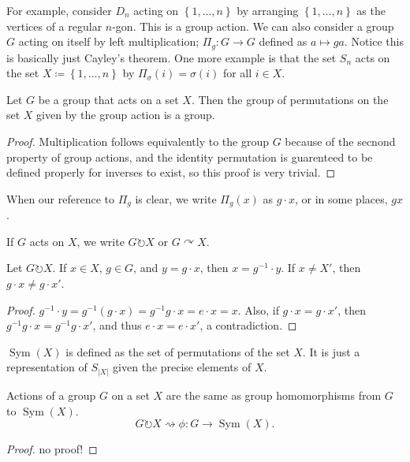 For example, consider $D_n$ acting on $\left\{ 1,\ldots, n \right\} $ by arranging $\left\{ 1, \ldots,n \right\} $ as the vertices of a regular $n$-gon. This is a group action. We can also consider a group $G$ acting on itself by left multiplication; $\Pi_g : G \to G$ defined as $a\mapsto ga$. Notice this is basically just Cayley's theorem. One more example is that the set $S_n$ acts on the set $X\coloneqq \left\{ 1,\ldots,n \right\} $ by $\Pi_\sigma (i)=\sigma(i)$ for all $i\in X$.
\begin{proposition}
	Let $G$ be a group that acts on a set $X$. Then the group of permutations on the set $X$ given by the group action is a group.
\end{proposition}
\begin{proof}
	Multiplication follows equivalently to the group $G$ because of the secnond property of group actions, and the identity permutation is guarenteed to be defined properly for inverses to exist, so this proof is very trivial.
\end{proof}
\begin{notation}
	When our reference to $\Pi_g$ is clear, we write $\Pi_g(x) $ as $g\cdot x$, or in some places, $gx$.
\end{notation}
\begin{notation}
	If $G$ acts on $X$, we write $G \circlearrowright X$ or $G\curvearrowright X$.
\end{notation}
\begin{theorem}\label{thm:smnd}
	Let $G\circlearrowright X$. If $x\in X$, $g\in G$, and $y=g\cdot x$, then $x=g^{-1}\cdot y$. If $x\neq X'$, then $g\cdot x\neq g\cdot x'$.
\end{theorem}
\begin{proof}
	$g^{-1}\cdot y=g^{-1}\left( g\cdot x \right) =g^{-1}g\cdot x=e\cdot x=x$. Also, if $g\cdot x=g\cdot x'$, then $g^{-1}g\cdot x=g^{-1}g\cdot x'$, and thus $e\cdot x=e\cdot x'$, a contradiction.
\end{proof}
\begin{notation}
	$\operatorname{Sym}(X) $ is defined as the set of permutations of the set $X$. It is just a representation of $S_{\left| X \right| }$ given the precise elements of $X$.
\end{notation}
\begin{theorem}\label{thm:kjA}
	Actions of a group $G$ on a set $X$ are the same as group homomorphisms from $G$ to $\operatorname{Sym}(X) $.
	\[
		G\circlearrowright X\rightsquigarrow \phi : G \to \operatorname{Sym}(X) 
	.\]
\end{theorem}
\begin{proof}
	no proof!
\end{proof}

